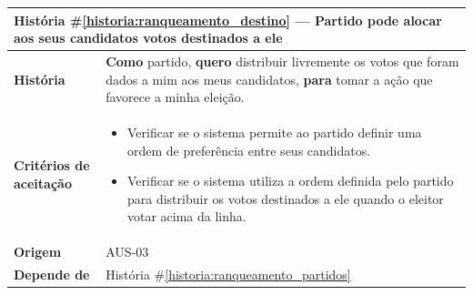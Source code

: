 \documentclass[12pt,a4paper]{article}
\newcounter{historia}
\begin{document}
\label{historia:ranqueamento_destino}
\begin{table}[H]
    \centering
    \begin{tabular}{|m{4.5cm} | m{11cm}|}
    \hline
    
    \multicolumn{2}{|l|}{\textbf{História \#\ref{historia:ranqueamento_destino} --- Partido pode alocar aos seus candidatos votos destinados a ele}} \\
    
    \hline  \textbf{História} &
    \textbf{Como} partido, \newline
    \textbf{quero} distribuir livremente os votos que foram dados a mim aos meus candidatos, \newline  
    \textbf{para} tomar a ação que favorece a minha eleição. \\
    
 \textbf{Critérios de aceitação} &
    \begin{itemize}
        \item{Verificar se o sistema permite ao partido definir uma ordem de preferência entre seus candidatos.}
        \item{Verificar se o sistema utiliza a ordem definida pelo partido para distribuir os votos destinados a ele quando o eleitor votar acima da linha.}
    \end{itemize}\\

    
    
    \textbf{Origem} &
    AUS-03 \\
    
    \textbf{Depende de} &
    História \#\ref{historia:ranqueamento_partidos} \\
    
    \hline
    \end{tabular}
\end{table}
\end{document}
